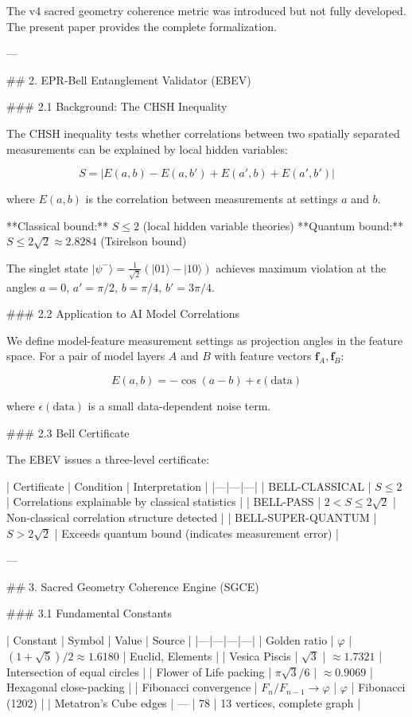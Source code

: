 The v4 sacred geometry coherence metric was introduced but not fully developed. The present paper provides the complete formalization.

---

## 2. EPR-Bell Entanglement Validator (EBEV)

### 2.1 Background: The CHSH Inequality

The CHSH inequality tests whether correlations between two spatially separated measurements can be explained by local hidden variables:

\[
S = |E(a,b) - E(a,b') + E(a',b) + E(a',b')|
\]

where \( E(a,b) \) is the correlation between measurements at settings \( a \) and \( b \).

**Classical bound:** \( S \leq 2 \) (local hidden variable theories)
**Quantum bound:** \( S \leq 2\sqrt{2} \approx 2.8284 \) (Tsirelson bound)

The singlet state \( |\psi^-\rangle = \frac{1}{\sqrt{2}}(|01\rangle - |10\rangle) \) achieves maximum violation at the angles \( a = 0 \), \( a' = \pi/2 \), \( b = \pi/4 \), \( b' = 3\pi/4 \).

### 2.2 Application to AI Model Correlations

We define model-feature measurement settings as projection angles in the feature space. For a pair of model layers \( A \) and \( B \) with feature vectors \( \mathbf{f}_A, \mathbf{f}_B \):

\[
E(a, b) = -\cos(a - b) + \epsilon(\text{data})
\]

where \( \epsilon(\text{data}) \) is a small data-dependent noise term.

### 2.3 Bell Certificate

The EBEV issues a three-level certificate:

| Certificate | Condition | Interpretation |
|---|---|---|
| BELL-CLASSICAL | \( S \leq 2 \) | Correlations explainable by classical statistics |
| BELL-PASS | \( 2 < S \leq 2\sqrt{2} \) | Non-classical correlation structure detected |
| BELL-SUPER-QUANTUM | \( S > 2\sqrt{2} \) | Exceeds quantum bound (indicates measurement error) |

---

## 3. Sacred Geometry Coherence Engine (SGCE)

### 3.1 Fundamental Constants

| Constant | Symbol | Value | Source |
|---|---|---|---|
| Golden ratio | \( \varphi \) | \( (1+\sqrt{5})/2 \approx 1.6180 \) | Euclid, Elements |
| Vesica Piscis | \( \sqrt{3} \) | \( \approx 1.7321 \) | Intersection of equal circles |
| Flower of Life packing | \( \pi\sqrt{3}/6 \) | \( \approx 0.9069 \) | Hexagonal close-packing |
| Fibonacci convergence | \( F_n/F_{n-1} \to \varphi \) | \( \varphi \) | Fibonacci (1202) |
| Metatron's Cube edges | --- | 78 | 13 vertices, complete graph |

